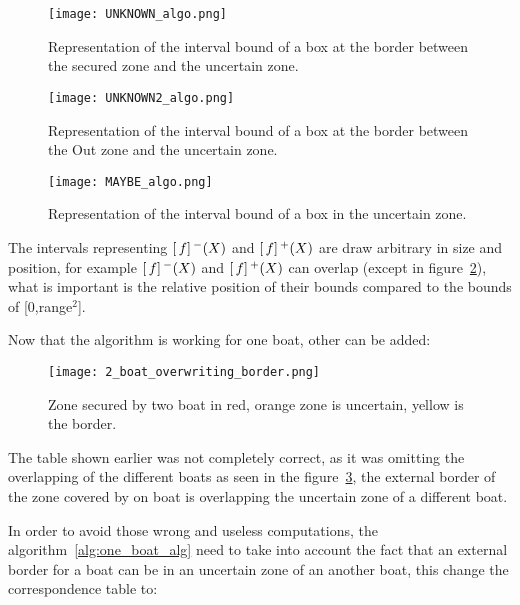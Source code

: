 \begin{figure}[H]
\centering
    \begin{minipage}[b]{0.4\textwidth}
    \texttt{[image: UNKNOWN\_algo.png]}
    \caption{Representation of the interval bound of a box at the border between the secured zone and the uncertain zone.}
    \label{fig:UNKNOWN_algo}
    \end{minipage}
    \begin{minipage}[b]{0.4\textwidth}
    \texttt{[image: UNKNOWN2\_algo.png]}
    \caption{Representation of the interval bound of a box at the border between the Out zone and the uncertain zone.}
    \label{fig:UNKNOWN2_algo}
    \end{minipage}
\end{figure}

\begin{figure}[H]
\centering
    \texttt{[image: MAYBE\_algo.png]}
    \caption{Representation of the interval bound of a box in the uncertain zone.}
    \label{fig:MAYBE_algo}
\end{figure}

The intervals representing $[\,f]\,^{\textnormal{\ensuremath{-}}}(X)$ and $[\,f]\,^{\textnormal{\ensuremath{+}}}(X)$ are draw arbitrary in size and position, for example  $[\,f]\,^{\textnormal{\ensuremath{-}}}(X)$ and $[\,f]\,^{\textnormal{\ensuremath{+}}}(X)$ can overlap (except in figure~\ref{fig:MAYBE_algo}), what is important is the relative position of their bounds compared to the bounds of [0,range$^{2}$].\newline

Now that the algorithm is working for one boat, other can be added:

\begin{figure}[H]
\centering
    \texttt{[image: 2\_boat\_overwriting\_border.png]}
    \caption{Zone secured by two boat in red, orange zone is uncertain, yellow is the border.}
    \label{fig:SecureZoneTwoBoat}
\end{figure}


The table shown earlier was not completely correct, as it was omitting the overlapping of the different boats as seen in the figure~\ref{fig:SecureZoneTwoBoat}, the external border of the zone covered by on boat is overlapping the uncertain zone of a different boat.\newline

In order to avoid those wrong and useless computations, the algorithm~\ref{alg:one_boat_alg} need to take into account the fact that an external border for a boat can be in an uncertain zone of an another boat, this change the correspondence table to:

